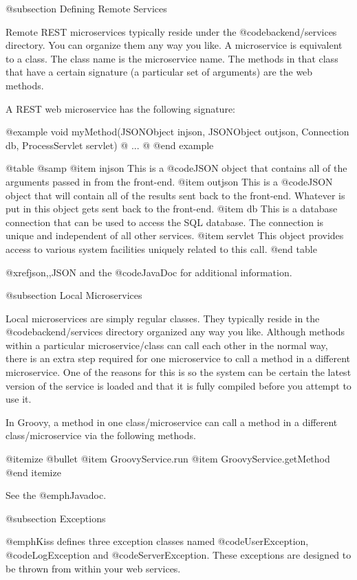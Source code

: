 @subsection Defining Remote Services

Remote REST microservices typically reside under the
@code{backend/services} directory.  You can organize them any way you
like.  A microservice is equivalent to a class.  The class name is the
microservice name.  The methods in that class that have a certain
signature (a particular set of arguments) are the web methods.

A REST web microservice has the following signature:

@example
void myMethod(JSONObject injson, 
              JSONObject outjson, 
              Connection db, 
              ProcessServlet servlet) @{
...
@}
@end example

@table @samp
@item injson
This is a @code{JSON} object that contains all of the arguments passed
in from the front-end.
@item outjson
This is a @code{JSON} object that will contain all of the results
sent back to the front-end.  Whatever is put in this object gets sent back to the front-end.
@item db
This is a database connection that can be used to access the SQL database.  The
connection is unique and independent of all other services.
@item servlet
This object provides access to various system facilities uniquely related
to this call.
@end table

@xref{json,,JSON} and the @code{JavaDoc} for additional information.


@subsection Local Microservices

Local microservices are simply regular classes.  They typically reside
in the @code{backend/services} directory organized any way you like.
Although methods within a particular microservice/class can call each
other in the normal way, there is an extra step required for one
microservice to call a method in a different microservice.  One of the
reasons for this is so the system can be certain the latest version of
the service is loaded and that it is fully compiled before you attempt
to use it.

In Groovy, a method in one class/microservice can call a method
in a different class/microservice via the following methods.

@itemize @bullet
@item
GroovyService.run
@item
GroovyService.getMethod
@end itemize

See the @emph{Javadoc}.

@subsection Exceptions

@emph{Kiss} defines three exception classes named
@code{UserException}, @code{LogException} and @code{ServerException}.
These exceptions are designed to be thrown from within your web
services.

